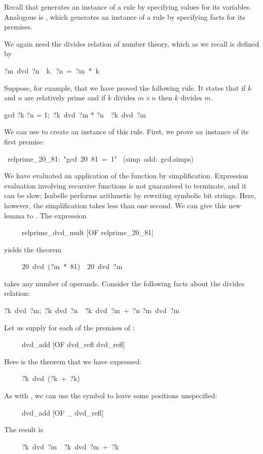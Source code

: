 %
Recall that  generates an instance of a
rule by specifying values for its variables.  Analogous is , which
generates an instance of a rule by specifying facts for its premises.  

We again need the divides relation of number theory, which
as we recall is defined by 
\begin{isabelle}
?m\ dvd\ ?n\ \isasymequiv\ {\isasymexists}k.\ ?n\ =\ ?m\ *\ k
\end{isabelle}
%
Suppose, for example, that we have proved the following rule.  
It states that if $k$ and $n$ are relatively prime
and if $k$ divides $m\times n$ then $k$ divides $m$.
\begin{isabelle}
\isasymlbrakk gcd ?k ?n {=} 1;\ ?k\ dvd\ ?m * ?n\isasymrbrakk\
\isasymLongrightarrow\ ?k\ dvd\ ?m
\end{isabelle}
We can use  to create an instance of this rule.
First, we
prove an instance of its first premise:
\begin{isabelle}
\ relprime\_20\_81:\ "gcd\ 20\ 81\ =\ 1"\isanewline
\isacommand{by}\ (simp\ add:\ gcd.simps)
\end{isabelle}
We have evaluated an application of the  function by
simplification.  Expression evaluation involving recursive functions is not
guaranteed to terminate, and it can be slow; Isabelle
performs arithmetic by  rewriting symbolic bit strings.  Here,
however, the simplification takes less than one second.  We can
give this new lemma to .  The expression
\begin{isabelle}
\ \ \ \ \ relprime_dvd_mult [OF relprime_20_81]
\end{isabelle}
yields the theorem
\begin{isabelle}
\ \ \ \ \ 20\ dvd\ (?m\ *\ 81)\ \isasymLongrightarrow\ 20\ dvd\ ?m%
\end{isabelle}
%
 takes any number of operands.  Consider 
the following facts about the divides relation: 
\begin{isabelle}
\isasymlbrakk?k\ dvd\ ?m;\
?k\ dvd\ ?n\isasymrbrakk\
\isasymLongrightarrow\ ?k\ dvd\
?m\ +\ ?n
\rulename{dvd_add}\isanewline
?m\ dvd\ ?m%
\rulename{dvd_refl}
\end{isabelle}
Let us supply \isa{dvd_refl} for each of the premises of :
\begin{isabelle}
\ \ \ \ \ dvd_add [OF dvd_refl dvd_refl]
\end{isabelle}
Here is the theorem that we have expressed: 
\begin{isabelle}
\ \ \ \ \ ?k\ dvd\ (?k\ +\ ?k)
\end{isabelle}
As with \isa{of}, we can use the \isa{_} symbol to leave some positions
unspecified:
\begin{isabelle}
\ \ \ \ \ dvd_add [OF _ dvd_refl]
\end{isabelle}
The result is 
\begin{isabelle}
\ \ \ \ \ ?k\ dvd\ ?m\ \isasymLongrightarrow\ ?k\ dvd\ ?m\ +\ ?k
\end{isabelle}

